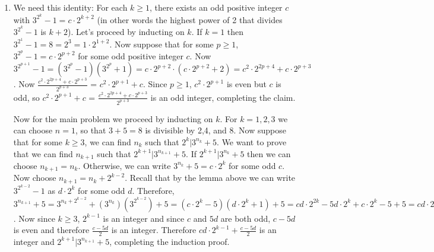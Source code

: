 \documentclass[11pt]{article}
\begin{document}
\begin{enumerate}
\item We need this identity: For each $k\ge 1$, there exists an odd positive integer $c$ with $3^{2^k}-1=c\cdot 2^{k+2}$ (in other words the highest power of 2 that divides $3^{2^k}-1$ is $k+2$). Let's proceed by inducting on $k$. If $k=1$ then $3^{2^1}-1=8=2^3=1\cdot 2^{1+2}$. Now suppose that for some $p\ge 1$, $3^{2^p}-1=c\cdot 2^{p+2}$ for some odd positive integer $c$. Now $3^{2^{p+1}}-1=(3^{2^p}-1)(3^{2^p}+1)=c\cdot 2^{p+2}\cdot(c\cdot 2^{p+2}+2) = c^2\cdot 2^{2p+4}+ c\cdot 2^{p+3}$. Now $\frac{c^2\cdot 2^{2p+4}+ c\cdot 2^{p+3}}{2^{p+3}}$ = $c^2\cdot 2^{p+1}+c.$ Since $p\ge 1$, $c^2\cdot 2^{p+1}$ is even but $c$ is odd, so $c^2\cdot 2^{p+1}+c$ = $\frac{c^2\cdot 2^{2p+4}+ c\cdot 2^{p+3}}{2^{p+3}}$ is an odd integer, completing the claim.

Now for the main problem we proceed by inducting on $k$. For $k=1,2,3$ we can choose $n=1$, so that $3+5=8$ is divisible by 2,4, and 8. Now suppose that for some $k\ge 3$, we can find $n_k$ such that $2^k|3^{n_k}+5$. We want to prove that we can find $n_{k+1}$ such that $2^{k+1}|3^{n_{k+1}}+5.$ If $2^{k+1}|3^{n_k}+5$ then we can choose $n_{k+1}=n_k$. Otherwise, we can write $3^{n_k}+5=c\cdot 2^k$ for some odd $c$. Now choose $n_{k+1}=n_k+2^{k-2}$. Recall that by the lemma above we can write $3^{2^{k-2}}-1$ as $d\cdot 2^k$ for some odd $d$. Therefore, $3^{n_{k+1}}+5=3^{n_k+2^{k-2}}+(3^{n_k})(3^{2^{k-2}})+5=(c\cdot 2^k-5)(d\cdot 2^k+1)+5=cd\cdot 2^{2k}-5d\cdot 2^k+c\cdot 2^k -5 +5 = cd\cdot 2^{2k}+(c-5d)\cdot 2^k = (2^{k+1})(cd\cdot 2^{k-1}+\frac{c-5d}{2})$. Now since $k\ge 3$, $2^{k-1}$ is an integer and since $c$ and $5d$ are both odd, $c-5d$ is even and therefore $\frac{c-5d}{2}$ is an integer. Therefore $cd\cdot 2^{k-1}+\frac{c-5d}{2}$ is an integer and $2^{k+1}|3^{n_{k+1}}+5$, completing the induction proof.
\end{enumerate}
\end{document}
